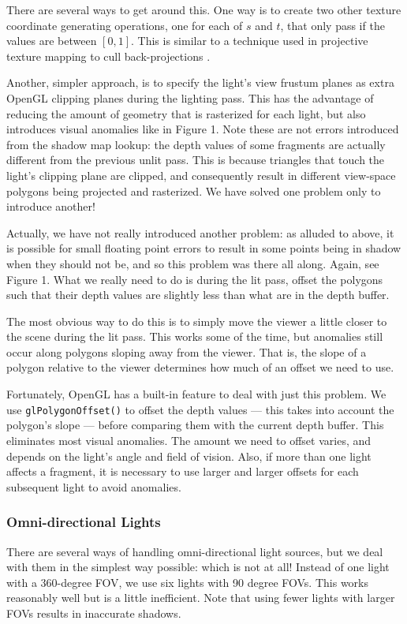 \documentclass{llncs}
\begin{document}
\begin{multicols}{2}
{There are several ways to get around this.  One way is to create two other
texture coordinate generating operations, one for each of $s$ and $t$, that only pass if the 
values are between $[0,1]$.  This is similar to a technique used in projective texture mapping to
cull back-projections \cite{projective}.

Another, simpler approach, is to specify the light's view frustum planes
as extra OpenGL clipping planes during the lighting pass.  
This has the advantage of reducing the amount of geometry
that is rasterized for each light, but also introduces visual anomalies like in Figure 1.
Note these are not errors introduced from the shadow map lookup: the depth 
values of some fragments are actually different from the previous unlit pass.  This is because 
triangles that touch the light's clipping plane are clipped, and consequently 
result in different view-space polygons being projected and rasterized.  
We have solved one problem only to introduce another!

Actually, we have not really introduced another problem:  as alluded to above, it is possible
for small floating point errors to result in some points being in shadow when they 
should not be, and so this problem was there all along.  
Again, see Figure 1.
What we really need to do is during the lit pass, offset the polygons such that their depth 
values are slightly less than what are in the depth buffer.

The most obvious way to do this is to simply move the viewer a little closer to the scene 
during the lit pass.  This works some of the time, but anomalies still occur along polygons 
sloping away from the viewer.  That is, the slope of a polygon relative
to the viewer determines how much of an offset we need to use.

Fortunately, OpenGL has a built-in feature to deal with just this problem.  We use
{\tt glPolygonOffset()} to offset the depth values --- this takes into account the polygon's 
slope --- before comparing them with the current depth buffer.  
This eliminates most visual anomalies.  The amount we need to offset varies, 
and depends on the light's angle and field of vision.  Also, if more than one light 
affects a fragment, it is 
necessary to use larger and larger offsets for each subsequent light to avoid anomalies. 

\subsubsection{Omni-directional Lights} There are several ways of handling omni-directional
light sources, but we deal with them in the simplest way possible: which is not at all!
Instead of one light with a 360-degree FOV, we use six lights with 90 degree FOVs.  
This works reasonably well but is a little inefficient.  
Note that using fewer lights with larger FOVs results in inaccurate shadows.

}
\end{multicols}
\end{document}
